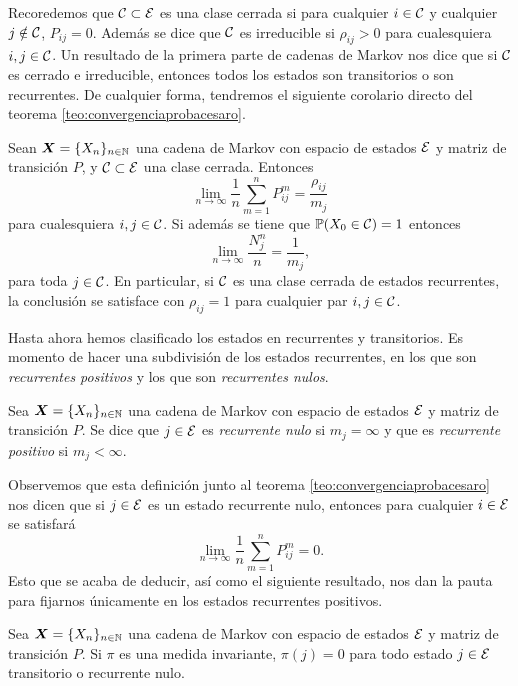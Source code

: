 Recoredemos que $\mathcal{C} \subset \mathcal{E}$ es una clase cerrada si para cualquier $i \in \mathcal{C}$ y cualquier $j \notin \mathcal{C}$, $P_{ij} = 0$. Además se dice que $\mathcal{C}$ es irreducible si $\rho_{ij} > 0$ para cualesquiera $i, j \in \mathcal{C}$. Un resultado de la primera parte de cadenas de Markov nos dice que si $\mathcal{C}$ es cerrado e irreducible, entonces todos los estados son transitorios o son recurrentes. De cualquier forma, tendremos el siguiente corolario directo del teorema \ref{teo:convergenciaprobacesaro}.

\begin{corollary}
    Sean $\bm X = \{X_n\}_{n \in \mathbb{N}}$ una cadena de Markov con espacio de estados $\mathcal{E}$ y matriz de transición $P$, y $\mathcal{C} \subset \mathcal{E}$ una clase cerrada. Entonces
    \[
        \lim_{n \to \infty} \frac 1 n \sum_{m = 1}^n P_{ij}^m = \frac{\rho_{ij}}{m_j}    
    \] para cualesquiera $i, j \in \mathcal{C}$. Si además se tiene que $\mathbb{P}(X_0 \in \mathcal{C}) = 1$ entonces
    \[
        \lim_{n \to \infty} \frac{N_j^n}{n} = \frac{1}{m_j},
    \]
    para toda $j \in \mathcal{C}$. En particular, si $\mathcal{C}$ es una clase cerrada de estados recurrentes, la conclusión se satisface con $\rho_{ij} = 1$ para cualquier par $i, j \in \mathcal{C}$.
\end{corollary}

Hasta ahora hemos clasificado los estados en recurrentes y transitorios. Es momento de hacer una subdivisión de los estados recurrentes, en los que son \emph{recurrentes positivos} y los que son \emph{recurrentes nulos}.

\begin{definition}
    Sea $\bm X = \{X_n\}_{n \in \mathbb{N}}$ una cadena de Markov con espacio de estados $\mathcal{E}$ y matriz de transición $P$. Se dice que $j \in \mathcal{E}$ es \emph{recurrente nulo} si $m_j = \infty$ y que es \emph{recurrente positivo} si $m_j < \infty$.
\end{definition}

Observemos que esta definición junto al teorema \ref{teo:convergenciaprobacesaro} nos dicen que si $j \in \mathcal{E}$ es un estado recurrente nulo, entonces para cualquier $i \in \mathcal{E}$ se satisfará
\[
    \lim_{n \to \infty} \frac 1 n \sum_{m = 1}^n P_{ij}^m = 0.
\]
Esto que se acaba de deducir, así como el siguiente resultado, nos dan la pauta para fijarnos únicamente en los estados recurrentes positivos.

\begin{proposition}
    Sea $\bm X = \{X_n\}_{n \in \mathbb{N}}$ una cadena de Markov con espacio de estados $\mathcal{E}$ y matriz de transición $P$. Si $\pi$ es una medida invariante, $\pi(j) = 0$ para todo estado $j \in \mathcal{E}$ transitorio o recurrente nulo.
\end{proposition}


